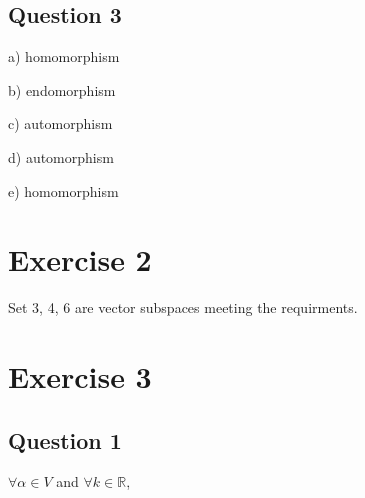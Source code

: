 \documentclass{article}
\begin{document}
\subsection{Question 3}

a) homomorphism

b) endomorphism

c) automorphism

d) automorphism

e) homomorphism

\section{Exercise 2}

Set 3, 4, 6 are vector subspaces meeting the requirments.

\section{Exercise 3}

\subsection{Question 1}

$\forall \alpha \in V$ and $\forall k \in \mathbb{R}$, 
\end{document}
